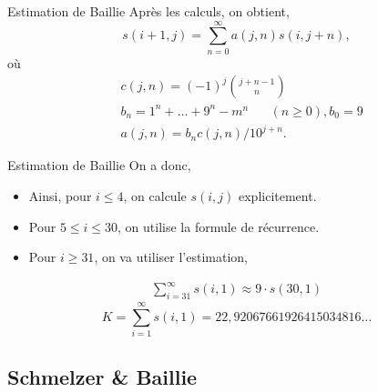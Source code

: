 \documentclass{beamer}
\newtheorem{exm}{Exemple}
\begin{document}
\begin{frame}{Estimation de Baillie}
	Apr\`es les calculs, on obtient,
	\[
		s(i+1, j) = \sum_{n=0}^{\infty}a(j,n)s(i, j+n),
	\]
	o\`u
	\begin{align*}
		&c(j, n) = (-1)^{j} \binom{j+n-1}{n}\\
		&b_{n}=1^{n}+\ldots + 9^{n} - m^{n} \hspace{20pt} (n\ge0), b_{0} = 9\\
		&a(j, n) = b_{n}c(j, n)/10^{j+n}.
	\end{align*}
\end{frame}

\begin{frame}{Estimation de Baillie}
	On a donc,
	\begin{itemize}
		\item[\textbullet] Ainsi, pour $i\le4$, on calcule $s(i, j)$ explicitement.
		\item[\textbullet] Pour $5\le i\le30$, on utilise la formule de r\'ecurrence.
		\item[\textbullet] Pour $i\ge31$, on va utiliser l'estimation,
	\end{itemize}
	\begin{gather*}
		\sum_{i=31}^{\infty} s(i,1) \approx 9 \cdot s(30, 1) 
	\end{gather*}
	\[
		K = \sum_{i=1}^{\infty} s(i, 1) = 22,92067661926415034816\ldots
	\]
\end{frame}
	
\subsection{Schmelzer \& Baillie}

\end{document}
